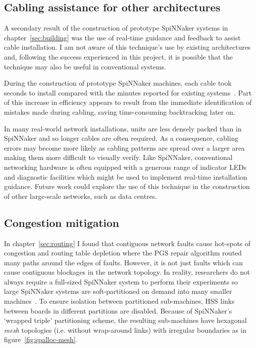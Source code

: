 		\subsection{Cabling assistance for other architectures}
			
			A secondary result of the construction of prototype SpiNNaker systems in
			chapter~\ref{sec:building} was the use of real-time guidance and feedback
			to assist cable installation. I am not aware of this technique's use by
			existing architectures and, following the success experienced in this
			project, it is possible that the technique may also be useful in
			conventional systems.
			
			During the construction of prototype SpiNNaker machines, each cable took
			seconds to install compared with the minutes reported for existing
			systems~\cite{mudigonda11}. Part of this increase in efficiency appears
			to result from the immediate identification of mistakes made during
			cabling, saving time-consuming backtracking later on.
			
			In many real-world network installations, units are less densely packed
			than in SpiNNaker and so longer cables are often required. As a
			consequence, cabling errors may become more likely as cabling patterns
			are spread over a larger area making them more difficult to visually
			verify. Like SpiNNaker, conventional networking hardware is often
			equipped with a generous range of indicator LEDs and diagnostic
			facilities which might be used to implement real-time installation
			guidance. Future work could explore the use of this technique in the
			construction of other large-scale networks, such as data centres.
		
		\subsection{Congestion mitigation}
			
			\label{sec:wiggly-board-allocations}
			
			In chapter~\ref{sec:routing} I found that contiguous network faults cause
			hot-spots of congestion and routing table depletion where the PGS repair
			algorithm routed many paths around the edges of faults.  However, it is
			not just faults which can cause contiguous blockages in the network
			topology. In reality, researchers do not always require a full-sized
			SpiNNaker system to perform their experiments so large SpiNNaker systems
			are soft-partitioned on demand into many smaller
			machines~\cite{spalloc16}. To ensure isolation between partitioned
			sub-machines, HSS links between boards in different partitions are
			disabled. Because of SpiNNaker's `wrapped triple' partitioning scheme,
			the resulting sub-machines have hexagonal \emph{mesh} topologies (i.e.
			without wrap-around links) with irregular boundaries as in
			figure~\ref{fig:spalloc-mesh}.
			

